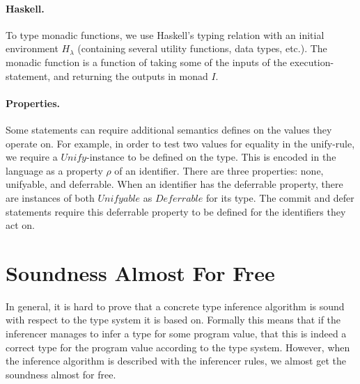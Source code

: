 \documentclass[preprint,natbib]{sigplanconf}
\newcommand{\Conid}[1]{\mathit{#1}}
\newcommand\Haskell{H_{\!\lambda}}
\newcommand\Prop{\rho}
\begin{document}
  \paragraph{Haskell.}
  To type monadic functions, we use Haskell's typing relation with an initial environment $\Haskell$ (containing several utility
  functions, data types, etc.). The monadic function is a function of taking some of the inputs of the execution-statement, and
  returning the outputs in monad $I$.
  
  \paragraph{Properties.}
  Some statements can require additional semantics defines on the values they operate on. For example, in order to test two values
  for equality in the unify-rule, we require a \ensuremath{\Conid{Unify}}-instance to be defined on the type. This is encoded in the language as a property
  $\Prop$ of an identifier. There are three properties: none, unifyable, and deferrable. When an identifier has the deferrable
  property, there are instances of both \ensuremath{\Conid{Unifyable}} as \ensuremath{\Conid{Deferrable}} for its type. The commit and defer statements require this deferrable
  property to be defined for the identifiers they act on.


\section{Soundness Almost For Free}
\label{sect:soundness}

  In general, it is hard to prove that a concrete type inference algorithm is sound with respect to the
  type system it is based on. Formally this means that if the inferencer manages to infer a type for
  some program value, that this is indeed a correct type for the program value according to the type
  system. However, when the inference algorithm is described with the inferencer rules, we almost get
  the soundness almost for free.
  
\end{document}
